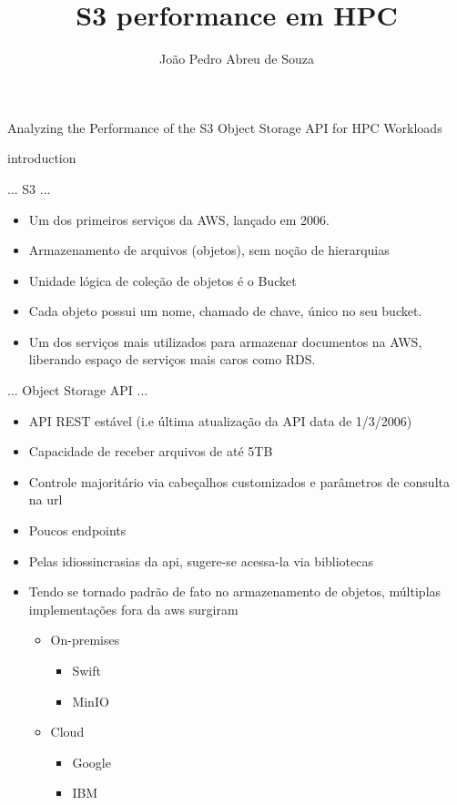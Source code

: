 \documentclass{beamer}
\title{S3 performance em HPC}
\author{João Pedro Abreu de Souza}
\begin{document}
\begin{frame}{Analyzing the Performance of the S3 Object Storage API for HPC Workloads}
\end{frame}
{introduction}
\begin{frame}{... S3 ...}
	\begin{itemize}
		\item 	Um dos primeiros serviços da AWS, lançado em 2006.
		\pause
		\item	Armazenamento de arquivos (objetos), sem noção de hierarquias
		\pause
		\item	Unidade lógica de coleção de objetos é o Bucket
		\pause
		\item	Cada objeto possui um nome, chamado de chave, único no seu bucket.
		\pause
		\item	Um dos serviços mais utilizados para armazenar documentos na AWS, liberando espaço de serviços mais caros como RDS.
	\end{itemize}
\end{frame}
\begin{frame}{... Object Storage API ...}
	\begin{itemize}
		\item API REST estável (i.e última atualização da API data de 1/3/2006)
		\pause
		\item Capacidade de receber arquivos de até 5TB
		\pause
		\item Controle majoritário via cabeçalhos customizados e parâmetros de consulta na url
		\pause
		\item Poucos endpoints
		\pause
		\item Pelas idiossincrasias da api, sugere-se acessa-la via bibliotecas
		\pause
		\item Tendo se tornado padrão de fato no armazenamento de objetos, múltiplas implementações fora da aws surgiram
		\begin{itemize}
			\item On-premises
				\begin{itemize}
					\item Swift
					\item MinIO
				\end{itemize}
			\item Cloud
				\begin{itemize}
					\item Google
					\item IBM
				\end{itemize}
		\end{itemize}
	\end{itemize}
\end{frame}
\end{document}
